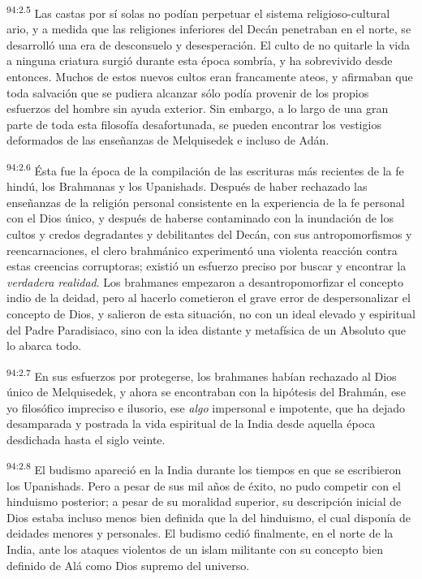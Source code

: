 \par
\textsuperscript{94:2.5} Las castas por sí solas no podían perpetuar el sistema religioso-cultural ario, y a medida que las religiones inferiores del Decán penetraban en el norte, se desarrolló una era de desconsuelo y desesperación. El culto de no quitarle la vida a ninguna criatura surgió durante esta época sombría, y ha sobrevivido desde entonces. Muchos de estos nuevos cultos eran francamente ateos, y afirmaban que toda salvación que se pudiera alcanzar sólo podía provenir de los propios esfuerzos del hombre sin ayuda exterior. Sin embargo, a lo largo de una gran parte de toda esta filosofía desafortunada, se pueden encontrar los vestigios deformados de las enseñanzas de Melquisedek e incluso de Adán.

\par
\textsuperscript{94:2.6} Ésta fue la época de la compilación de las escrituras más recientes de la fe hindú, los Brahmanas y los Upanishads. Después de haber rechazado las enseñanzas de la religión personal consistente en la experiencia de la fe personal con el Dios único, y después de haberse contaminado con la inundación de los cultos y credos degradantes y debilitantes del Decán, con sus antropomorfismos y reencarnaciones, el clero brahmánico experimentó una violenta reacción contra estas creencias corruptoras; existió un esfuerzo preciso por buscar y encontrar la \textit{verdadera realidad}. Los brahmanes empezaron a desantropomorfizar el concepto indio de la deidad, pero al hacerlo cometieron el grave error de despersonalizar el concepto de Dios, y salieron de esta situación, no con un ideal elevado y espiritual del Padre Paradisiaco, sino con la idea distante y metafísica de un Absoluto que lo abarca todo.

\par
\textsuperscript{94:2.7} En sus esfuerzos por protegerse, los brahmanes habían rechazado al Dios único de Melquisedek, y ahora se encontraban con la hipótesis del Brahmán, ese yo filosófico impreciso e ilusorio, ese \textit{algo} impersonal e impotente, que ha dejado desamparada y postrada la vida espiritual de la India desde aquella época desdichada hasta el siglo veinte.

\par
\textsuperscript{94:2.8} El budismo apareció en la India durante los tiempos en que se escribieron los Upanishads. Pero a pesar de sus mil años de éxito, no pudo competir con el hinduismo posterior; a pesar de su moralidad superior, su descripción inicial de Dios estaba incluso menos bien definida que la del hinduismo, el cual disponía de deidades menores y personales. El budismo cedió finalmente, en el norte de la India, ante los ataques violentos de un islam militante con su concepto bien definido de Alá como Dios supremo del universo.


